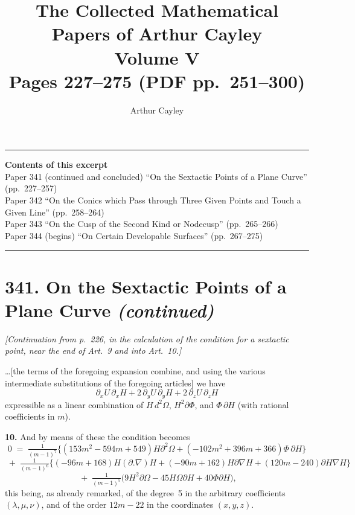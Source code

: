 \documentclass[11pt,a4paper]{article}
\title{\textbf{The Collected Mathematical Papers of Arthur Cayley}\\[6pt]
\Large Volume V\\[12pt]
\large Pages 227--275 \;(PDF pp.\ 251--300)}
\author{Arthur Cayley}
\date{}
\begin{document}
\maketitle
\thispagestyle{empty}

\vspace{1em}
\noindent\rule{\textwidth}{0.4pt}
\vspace{1em}

\begin{center}
\textbf{Contents of this excerpt}\\[4pt]
Paper 341 (continued and concluded) ``On the Sextactic Points of a Plane Curve'' (pp.~227--257)\\
Paper 342 ``On the Conics which Pass through Three Given Points and Touch a Given Line'' (pp.~258--264)\\
Paper 343 ``On the Cusp of the Second Kind or Nodecusp'' (pp.~265--266)\\
Paper 344 (begins) ``On Certain Developable Surfaces'' (pp.~267--275)
\end{center}

\noindent\rule{\textwidth}{0.4pt}
\vspace{1em}

\section*{341. On the Sextactic Points of a Plane Curve \textit{(continued)}}

\noindent\textit{[Continuation from p.~226, in the calculation of the condition for a sextactic point, near the end of Art.~9 and into Art.~10.]}

\medskip

\noindent\ldots [the terms of the foregoing expansion combine, and using the various intermediate substitutions of the foregoing articles] we have
\[
\partial_x U\,\partial_x H + 2\,\partial_y U\,\partial_y H + 2\,\partial_z U\,\partial_z H
\]
expressible as a linear combination of $H\,d^2\Omega$, $H^2\partial\Phi$, and $\Phi\,\partial H$ (with rational coefficients in $m$).

\textbf{10.} And by means of these the condition becomes
\[
0 \;=\; \tfrac{1}{(m-1)^7}\bigl\{(153m^2 - 594m + 549)H\partial^2\Omega + (-102m^2 + 396m + 366)\Phi\,\partial H\bigr\}
\]
\[
\;+\; \tfrac{1}{(m-1)^6}\bigl\{(-96m + 168)H(\partial.\nabla)H + (-90m + 162)H\partial\nabla\!H + (120m - 240)\partial H\nabla H\bigr\}
\]
\[
\;+\; \tfrac{1}{(m-1)^5}\bigl(9H^2\partial\Omega - 45H\Omega\partial H + 40\Phi\partial H\bigr),
\]
this being, as already remarked, of the degree~5 in the arbitrary coefficients $(\lambda,\mu,\nu)$, and of the order $12m-22$ in the coordinates $(x,y,z)$.
\end{document}
